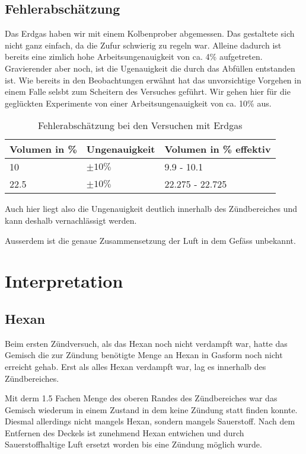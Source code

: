 \documentclass[11pt,paper=a4,final]{scrartcl}
\begin{document}
\subsection{Fehlerabsch\"atzung}
Das Erdgas haben wir mit einem Kolbenprober abgemessen. Das gestaltete sich
nicht ganz einfach, da die Zufur schwierig zu regeln war. Alleine dadurch ist
bereits eine zimlich hohe Arbeitsungenauigkeit von ca. 4\% aufgetreten.
Gravierender aber noch, ist die Ugenauigkeit die durch das Abf\"ullen entstanden
ist. Wie bereits in den Beobachtungen erw\"ahnt hat das unvorsichtige Vorgehen
in einem Falle selsbt zum Scheitern des Versuches gef\"uhrt. Wir gehen hier
f\"ur die gegl\"uckten Experimente von einer Arbeitsungenauigkeit von ca. 10\%
aus.
\begin{table}[h!]
  \centering
  \begin{tabular}{|l|l|l|}\hline
    \bf Volumen in \%	& \bf Ungenauigkeit	& \bf Volumen in \% effektiv \\
    \hline
    10			& \(\pm 10\%\)		& 9.9 - 10.1 \\
    \hline
    22.5		& \(\pm 10\%\)		& 22.275 - 22.725 \\
    \hline
  \end{tabular}
  \caption{Fehlerabsch\"atzung bei den Versuchen mit Erdgas}
  \label{tab:}
\end{table}
Auch hier liegt also die Ungenauigkeit deutlich innerhalb des Z\"undbereiches
und kann deshalb vernachl\"assigt werden.

Ausserdem ist die genaue Zusammensetzung der Luft in dem Gef\"ass unbekannt.

\section{Interpretation}
\subsection{Hexan}
Beim ersten Z\"undversuch, als das Hexan noch nicht verdampft war, hatte das
Gemisch die zur Z\"undung ben\"otigte Menge an Hexan in Gasform noch nicht
erreicht gehab. Erst als alles Hexan verdampft war, lag es innerhalb des
Z\"undbereiches.

Mit derm 1.5 Fachen Menge des oberen Randes des Z\"undbereiches war das Gemisch
wiederum in einem Zustand in dem keine Z\"undung statt finden konnte. Diesmal
allerdings nicht mangels Hexan, sondern mangels Sauerstoff. Nach dem Entfernen
des Deckels ist zunehmend Hexan entwichen und durch Sauerstoffhaltige Luft
ersetzt worden bis eine Z\"undung m\"oglich wurde.
\end{document}
